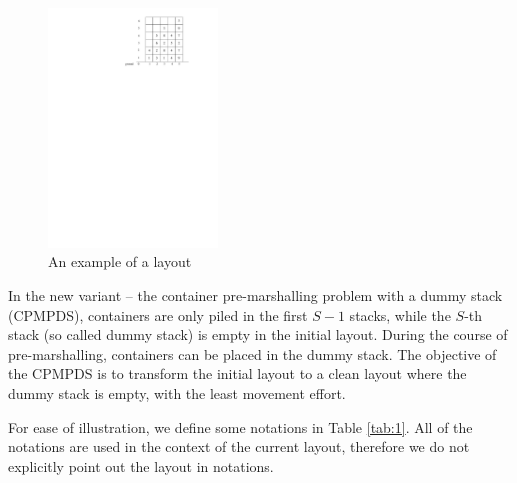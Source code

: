 \documentclass[review,3p,times,authoryear,12pt]{elsarticle}
\begin{document}
\begin{figure}[htbp]
\centering
\includegraphics[width=0.4\textwidth]{fig3.pdf}
\caption{An example of a layout}
\label{fig3}
\end{figure}


In the new variant -- the container pre-marshalling problem with a dummy stack (CPMPDS), containers are only piled in the first $S-1$ stacks, while the $S$-th stack (so called dummy stack) is empty in the initial layout. During the course of pre-marshalling, containers can be placed in the dummy stack. The objective of the CPMPDS is to transform the initial layout to a clean layout where the dummy stack is empty, with the least movement effort.

For ease of illustration, we define some notations in Table \ref{tab:1}. All of the notations are used in the context of the current layout, therefore we do not explicitly point out the layout in notations.
\end{document}
